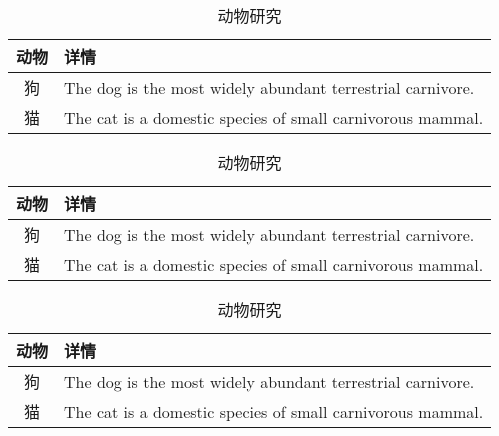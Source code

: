 \documentclass[a4paper, UTF-8,14pt]{ctexart}
\newcommand{\tcap}[1]{
	\caption{\zihao{5}\kaishu #1}
}
\begin{document}

\begin{table}[!h]
	\centering
	\tcap{动物研究} %
	
	\label{tab:t1} %
	\begin{tabular}{cl}
		\toprule
		动物 & 详情 \\
		\midrule
		狗    & The dog is the most widely abundant terrestrial carnivore. \\
		\addlinespace
		猫    & The cat is a domestic species of small carnivorous mammal.\\
		\bottomrule
	\end{tabular}
\end{table}

\begin{table}[!h]
	\centering
	\tcap{动物研究} %
	
	\label{tab:t2} %
	\begin{tabular}{cp{10cm}}
		\toprule
		动物 & 详情 \\
		\midrule
		狗    & The dog is the most widely abundant terrestrial carnivore. \\
		\addlinespace
		猫    & The cat is a domestic species of small carnivorous mammal.\\
		\bottomrule
	\end{tabular}
\end{table}

\begin{table}[!h]
	\centering
	\tcap{动物研究} %
	\label{tab:t3} %
	
	\begin{tabular}{cp{10cm}}%
		\toprule
		动物 & 详情 \\
		\midrule
		狗    & The dog is the most widely abundant terrestrial carnivore. \\
		\addlinespace
		猫    & The cat is a domestic species of small carnivorous mammal.\\
		\bottomrule
	\end{tabular}
\end{table}
\end{document}
